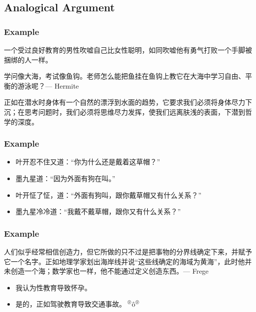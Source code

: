 \documentclass[UTF8,aspectratio=43,11pt,colorlinks,compress,openany]{beamer}%
\begin{document}
\subsection{Analogical Argument}

\begin{frame}\frametitle{Example}
	\begin{block}{}
		一个受过良好教育的男性吹嘘自己比女性聪明，如同吹嘘他有勇气打败一个手脚被捆绑的人一样。
	\end{block}
	\begin{block}{}
		学问像大海，考试像鱼钩。老师怎么能把鱼挂在鱼钩上教它在大海中学习自由、平衡的游泳呢？\hfill --- Hermite
	\end{block}
	\begin{block}{}
		正如在潜水时身体有一个自然的漂浮到水面的趋势，它要求我们必须将身体尽力下沉；在思考问题时，我们必须将思维尽力发挥，使我们远离肤浅的表面，下潜到哲学的深度。
	\end{block}
\end{frame}

\begin{frame}\frametitle{Example}
\begin{block}{}
	\begin{itemize}
		\item 叶开忍不住又道：“你为什么还是戴着这草帽？”
		\item 墨九星道：“因为外面有狗在叫。”
		\item 叶开怔了怔，道：“外面有狗叫，跟你戴草帽又有什么关系？”
		\item 墨九星冷冷道：“我戴不戴草帽，跟你又有什么关系？”
	\end{itemize}
\end{block}
\end{frame}

\begin{frame}\frametitle{Example}
	\begin{block}{}
		人们似乎经常相信创造力，但它所做的只不过是把事物的分界线确定下来，并赋予它一个名字。正如地理学家划出海岸线并说“这些线确定的海域为黄海”，此时他并未创造一个海；数学家也一样，他不能通过定义创造东西。\hfill --- Frege
	\end{block}
	\begin{block}{}
		\begin{itemize}
			\item 我认为性教育导致怀孕。
			\item 是的，正如驾驶教育导致交通事故。\textcolor{red}{$\sideset{^\circledcirc}{^\circledcirc}{\operatorname{\hat{o}}}$}
		\end{itemize}
	\end{block}
\end{frame}
\end{document}
